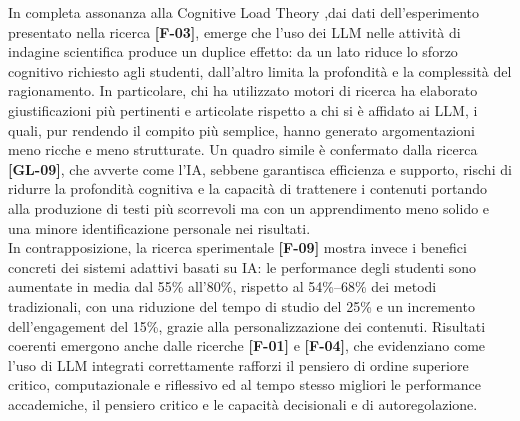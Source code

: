 \documentclass[a4paper,9pt]{article}
\begin{document}
In completa assonanza alla Cognitive Load Theory ,dai dati dell’esperimento presentato nella ricerca \textbf{[F-03]}, emerge che l’uso dei LLM nelle attività di indagine scientifica produce un duplice effetto: da un lato riduce lo sforzo cognitivo richiesto agli studenti, dall’altro limita la profondità e la complessità del ragionamento. In particolare, chi ha utilizzato motori di ricerca ha elaborato giustificazioni più pertinenti e articolate rispetto a chi si è affidato ai LLM, i quali, pur rendendo il compito più semplice, hanno generato argomentazioni meno ricche e meno strutturate. Un quadro simile è confermato dalla ricerca \textbf{[GL-09]}, che avverte come l’IA, sebbene garantisca efficienza e supporto, rischi di ridurre la profondità cognitiva e la capacità di trattenere i contenuti portando alla produzione di testi più scorrevoli ma con un apprendimento meno solido e una minore identificazione personale nei risultati.\\
In contrapposizione, la ricerca sperimentale \textbf{[F-09]} mostra invece i benefici concreti dei sistemi adattivi basati su IA: le performance degli studenti sono aumentate in media dal 55\% all’80\%, rispetto al 54\%–68\% dei metodi tradizionali, con una riduzione del tempo di studio del 25\% e un incremento dell’engagement del 15\%, grazie alla personalizzazione dei contenuti. Risultati coerenti emergono anche dalle ricerche \textbf{[F-01]} e \textbf{[F-04]}, che evidenziano come l’uso di LLM integrati correttamente rafforzi il pensiero di ordine superiore critico, computazionale e riflessivo ed al tempo stesso migliori le performance accademiche, il pensiero critico e le capacità decisionali e di autoregolazione.\\
\end{document}
